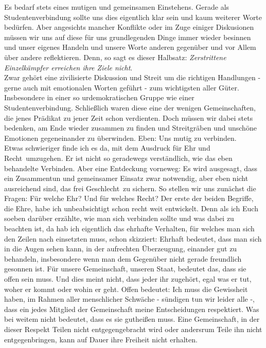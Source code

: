 \begin{multicols}{2}
Es bedarf stets eines mutigen und gemeinsamen Einstehens. Gerade als Studentenverbindung sollte uns dies eigentlich klar sein und kaum weiterer Worte bedürfen.
Aber angesichts mancher Konflikte oder im Zuge einiger Diskusionen müssen wir uns auf diese für uns grundlegenden Dinge immer wieder besinnen und unser eigenes Handeln und unsere Worte anderen gegenüber und vor Allem über andere reflektieren. Denn, so sagt es dieser Halbsatz: \textit{Zerstrittene Einzelkämpfer erreichen ihre Ziele nicht}.
\\
Zwar gehört eine zivilisierte Diskussion und Streit um die richtigen Handlungen - gerne auch mit emotionalen Worten geführt - zum wichtigsten aller Güter. Insbesondere in einer so urdemokratischen Gruppe wie einer Studentenverbindung. Schließlich waren diese eine der wenigen Gemeinschaften, die jenes Prädikat zu jener Zeit schon verdienten.
Doch müssen wir dabei stets bedenken, am Ende wieder zusammen zu finden und Streitgräben und unschöne Emotionen gegeneinander zu überwinden.
Eben: Uns mutig zu verbinden.
\\
Etwas schwieriger finde ich es da, mit dem Ausdruck \glqq für Ehr und Recht\grqq ~umzugehen. Er ist nicht so geradewegs verständlich, wie das eben behandelte Verbinden. Aber eine Entdeckung vorneweg: Es wird ausgesagt, dass ein Zusammentun und gemeinsamer Einsatz zwar notwendig, aber eben nicht ausreichend sind, das \glqq frei Geschlecht\grqq ~zu sichern.
So stellen wir uns zunächst die Fragen: Für welche Ehr? Und für welches Recht?
Der erste der beiden Begriffe, die Ehre, habe ich unbeabsichtigt schon recht weit entwickelt. Denn als ich Euch soeben darüber erzählte, wie man sich verbinden sollte und was dabei zu beachten ist, da hab ich eigentlich das ehrhafte Verhalten, für welches man sich den Zeilen nach einsetzten muss, schon skizziert:
Ehrhaft bedeutet, dass man sich in die Augen sehen kann, in der aufrechten Überzeugung, einander gut zu behandeln, insbesondere wenn man dem Gegenüber nicht gerade freundlich gesonnen ist.
Für unsere Gemeinschaft, unseren Staat, bedeutet das, dass sie offen sein muss. Und dies meint nicht, dass jeder ihr zugehört, egal was er tut, woher er kommt oder wohin er geht. Offen bedeutet: Ich muss die Gewissheit haben, im Rahmen aller menschlicher Schwäche - sündigen tun wir leider alle -, dass ein jedes Mitglied der Gemeinschaft meine Entscheidungen respektiert. Was bei weitem nicht bedeutet, dass es sie gutheißen muss. Eine Gemeinschaft, in der dieser Respekt Teilen nicht entgegengebracht wird oder andersrum Teile ihn nicht entgegenbringen, kann auf Dauer ihre  Freiheit nicht erhalten.

\end{multicols}
